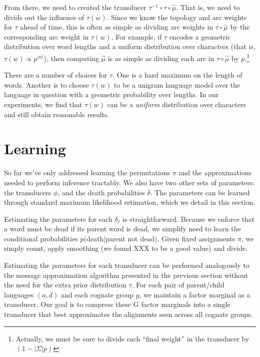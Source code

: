 \documentclass[11pt,a4paper]{article}
\begin{document}
From there, we need to created the transducer
$\tau^{-1}\circ\tau\circ\hat\mu$. That is, we need to divide out
the influence of $\tau(w)$. Since we know the topology and arc
weights for $\tau$ ahead of time, this is often as simple as dividing
arc weights in $\tau\circ\hat\mu$ by the corresponding arc weight
in $\tau(w)$. For example, if $\tau$ encodes a geometric distribution
over word lengths and a uniform distribution over characters (that
is, $\tau(w) \propto {p^{|w|}}$), then computing $\hat\mu$ is as
simple as dividing each arc in $\tau\circ\hat\mu$ by
$p$.\footnote{Actually, we must be sure to divide each ``final
weight'' in the transducer by $(1-|\Sigma| p)$}

There are a number of choices for $\tau$. One is a hard maximum on the
length of words. Another is to choose $\tau(w)$ to be a unigram
language model over the language in question with a geometric
probability over lengths. In our experiments, we find that $\tau(w)$
can be a \textit{uniform} distribution over characters and still
obtain reasonable results.


\section{Learning}

So far we've only addressed learning the permutations $\pi$ and
the approximations needed to perform inference tractably. We also
have two other sets of parameters: the transducers $\phi$, and the
death probabilities $\delta$. The parameters can be learned through
standard maximum likelihood estimation, which we detail in this
section.

Estimating the parameters for each $\delta_\ell$ is straightforward.
Because we enforce that a word must be dead if its parent word is
dead, we simplify need to learn the conditional probabilities
$p($death$|$parent not dead$)$. Given fixed assignments $\pi$, we
simply count, apply smoothing (we found XXX to be a good value) and
divide.

Estimating the parameters for each transducer can be performed
analogously to the message approximation algorithm presented in the
previous section without the need for the extra prior distribution
$\tau$. For each pair of parent/child languages $(a,d)$ and each
cognate group $g$, we maintain a factor marginal as a transducer.
Our goal is to compress these G factor marginals into a single
transducer that best approximates the alignments seen across all
cognate groups.
\end{document}
